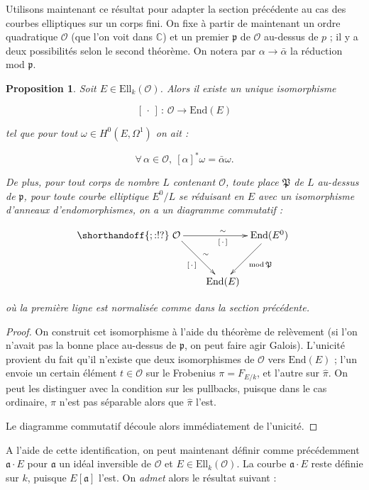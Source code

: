 \documentclass[11pt,a4paper]{article}
\newcommand{\C}{\mathbb{C}}
\renewcommand{\O}{\mathcal{O}}
\newcommand{\vers}{\longrightarrow}
\newcommand{\End}{\mathrm{End}}
\newcommand{\Ell}{\mathrm{Ell}}
\renewcommand{\frak}{\mathfrak}
\newcommand{\de}{\,:\,}
\newtheorem*{prop}{Proposition}
\theoremstyle{definition}
\begin{document}
Utilisons maintenant ce résultat pour adapter la section précédente au cas des courbes elliptiques sur un corps fini. On fixe à partir de maintenant un ordre quadratique $\O$ (que l'on voit dans $\C$) et un premier $\frak p$ de $\O$ au-dessus de $p$ ; il y a deux possibilités selon le second théorème. On notera par $\alpha\vers\bar{\alpha}$ la réduction mod $\frak p$.


\begin{prop}

Soit $E\in \Ell_k(\O)$. Alors il existe un unique isomorphisme

$$[\,\cdot\,] \de \O \vers \End(E)$$

tel que pour tout $\omega \in H^0(E,\Omega^1)$ on ait :

$$\forall \, \alpha \in \O,\ [\alpha]^* \omega = \bar{\alpha}\omega.$$

De plus, pour tout corps de nombre $L$ contenant $\O$, toute place $\frak P$ de $L$ au-dessus de $\frak p$, pour toute courbe elliptique $E^0/L$ se réduisant en $E$ avec un isomorphisme d'anneaux d'endomorphismes, on a un diagramme commutatif :

$$
\shorthandoff{;:!?}
\xymatrix @!=8mm {
\O \ar[rr]^\sim_{[\,\cdot\,]} \ar[rd]^\sim_{[\,\cdot\,]} & & \End(E^0) \ar[ld]^{\mathrm{mod}\,\frak P} \\
 & \End(E) & 
}
$$

où la première ligne est normalisée comme dans la section précédente.

\end{prop}

\begin{proof}

On construit cet isomorphisme à l'aide du théorème de relèvement (si l'on n'avait pas la bonne place au-dessus de $\frak p$, on peut faire agir Galois). L'unicité provient du fait qu'il n'existe que deux isomorphismes de $\O$ vers $\End(E)$ ; l'un envoie un certain élément $t\in \O$ sur le Frobenius $\pi = F_{E/k}$, et l'autre sur $\widehat{\pi}.$ On peut les distinguer avec la condition sur les pullbacks, puisque dans le cas ordinaire, $\pi$ n'est pas séparable alors que $\widehat{\pi}$ l'est.

Le diagramme commutatif découle alors immédiatement de l'unicité.
\end{proof}

A l'aide de cette identification, on peut maintenant définir comme précédemment $\frak a\cdot E$ pour $\frak a$ un idéal inversible de $\O$ et $E\in \Ell_k(\O)$. La courbe $\frak a\cdot E$ reste définie sur $k$, puisque $E[\frak a]$ l'est. On \emph{admet} alors le résultat suivant :
\end{document}
